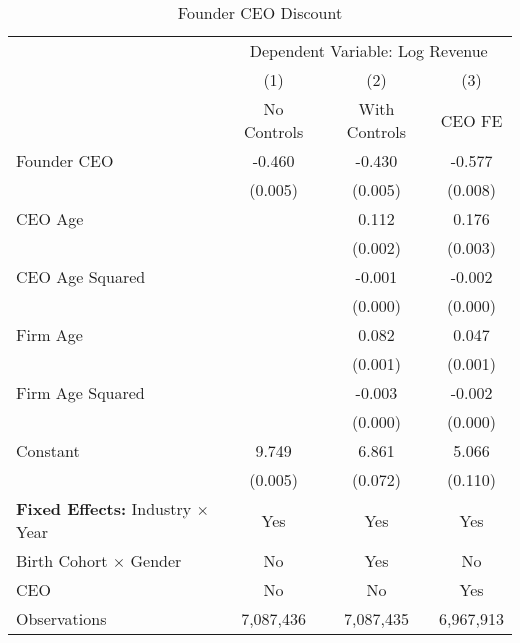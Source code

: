 \begin{table}[htbp]\centering
\caption{Founder CEO Discount}\label{tab:founder\_discount}
\begin{threeparttable}
\begin{tabular}{lccc}
\toprule
            &\multicolumn{3}{c}{Dependent Variable: Log Revenue}              \\\cmidrule(lr){2-4}
            &\multicolumn{1}{c}{(1)}&\multicolumn{1}{c}{(2)}&\multicolumn{1}{c}{(3)}\\
            &\multicolumn{1}{c}{No Controls}&\multicolumn{1}{c}{With Controls}&\multicolumn{1}{c}{CEO FE}\\
\midrule
Founder CEO &      -0.460\sym{***}&      -0.430\sym{***}&      -0.577\sym{***}\\
            &     (0.005)         &     (0.005)         &     (0.008)         \\
\addlinespace
CEO Age     &                     &       0.112\sym{***}&       0.176\sym{***}\\
            &                     &     (0.002)         &     (0.003)         \\
\addlinespace
CEO Age Squared&                     &      -0.001\sym{***}&      -0.002\sym{***}\\
            &                     &     (0.000)         &     (0.000)         \\
\addlinespace
Firm Age    &                     &       0.082\sym{***}&       0.047\sym{***}\\
            &                     &     (0.001)         &     (0.001)         \\
\addlinespace
Firm Age Squared&                     &      -0.003\sym{***}&      -0.002\sym{***}\\
            &                     &     (0.000)         &     (0.000)         \\
\addlinespace
Constant    &       9.749\sym{***}&       6.861\sym{***}&       5.066\sym{***}\\
            &     (0.005)         &     (0.072)         &     (0.110)         \\
\midrule
\textbf{Fixed Effects:}
Industry $\times$ Year & Yes & Yes & Yes \\
Birth Cohort $\times$ Gender & No & Yes & No \\
CEO & No & No & Yes \\
\midrule
Observations&   7,087,436         &   7,087,435         &   6,967,913         \\

\end{tabular}
\end{threeparttable}
\end{table}
